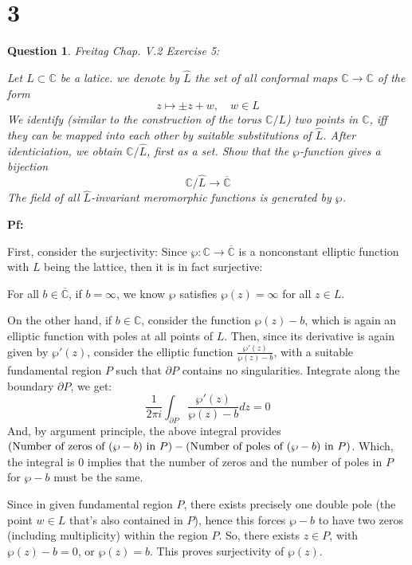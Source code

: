\documentclass{article}
\newtheorem{question}{Question}
\begin{document}
\section*{3}
\begin{myBox}[]{}
    \begin{question}
        Freitag Chap. V.2 Exercise 5:

        Let $L\subset \mathbb{C}$ be a latice. we denote by $\widehat{L}$ the set of all conformal maps $\mathbb{C}\rightarrow\mathbb{C}$ of the form 
        $$z\mapsto \pm z+w,\quad w\in L$$
        We identify (similar to the construction of the torus $\mathbb{C}/L$) two points in $\mathbb{C}$,
        iff they can be mapped into each other by suitable substitutions of $\widehat{L}$. After identiciation, we obtain $\mathbb{C}/\widehat{L}$, first as a set.
        Show that the $\wp$-function gives a bijection
        $$\mathbb{C}/\widehat{L}\rightarrow\overline{\mathbb{C}}$$
        The field of all $\widehat{L}$-invariant meromorphic functions is generated by $\wp$.
    \end{question}
\end{myBox}

\textbf{Pf:}

First, consider the surjectivity: Since $\wp:\mathbb{C}\rightarrow\overline{\mathbb{C}}$ is a nonconstant elliptic function with $L$ being the lattice, 
then it is in fact surjective:

For all $b\in\overline{\mathbb{C}}$, if $b=\infty$, we know $\wp$ satisfies $\wp(z)=\infty$ for all $z\in L$.

On the other hand, if $b\in\mathbb{C}$, consider the function $\wp(z)-b$, which is again an elliptic function with poles at all points of $L$.
Then, since its derivative is again given by $\wp'(z)$, consider the elliptic function $\frac{\wp'(z)}{\wp(z)-b}$, with a suitable fundamental region $P$ such that $\partial P$
contains no singularities. Integrate along the boundary $\partial P$, we get:
$$\frac{1}{2\pi i}\int_{\partial P}\frac{\wp'(z)}{\wp(z)-b}dz = 0$$
And, by argument principle, the above integral provides $(\textmd{Number of zeros of }(\wp-b)\textmd{ in }P)-(\textmd{Number of poles of }(\wp-b)\textmd{ in }P)$. Which, the integral is $0$
implies that the number of zeros and the number of poles in $P$ for $\wp-b$ must be the same.
 
Since in given fundamental region $P$, there exists precisely one double pole (the point $w\in L$ that's also contained in $P$),
hence this forces $\wp-b$ to have two zeros (including multiplicity) within the region $P$.
So, there exists $z\in P$, with  $\wp(z)-b=0$, or $\wp(z)=b$. This proves surjectivity of $\wp(z)$.
\end{document}
